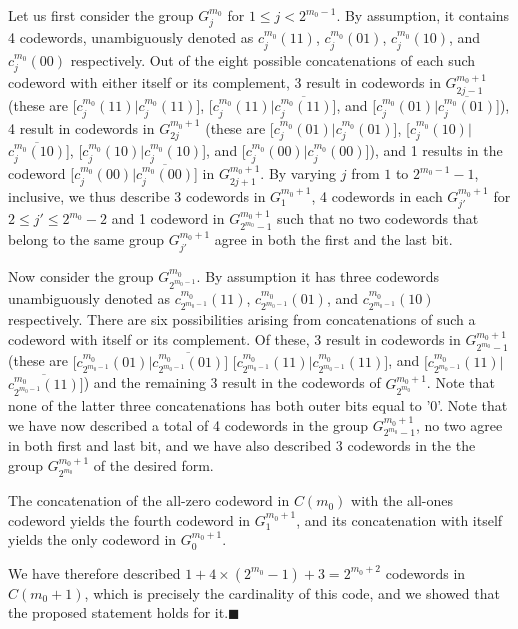 Let us first consider the group $G_j^{m_0}$ for $1 \leq j <
2^{m_0-1}$. By assumption, it contains 4 codewords, unambiguously denoted
as  $c_j^{m_0}(11)$,
$c_j^{m_0}(01)$, $c_j^{m_0}(10)$, and $c_j^{m_0}(00)$ respectively.
Out of the eight possible concatenations of each such codeword with either itself or its complement, 3 result in codewords in
$G_{2j-1}^{m_0+1}$ (these are [$c_j^{m_0}(11)|c_j^{m_0}(11)$],
[$c_j^{m_0}(11)|$$\overline{c_j^{m_0}(11)}$], and
[$c_j^{m_0}(01)|$$\overline{c_j^{m_0}(01)}$]), 4 result in codewords
in $G_{2j}^{m_0+1}$ (these are [$c_j^{m_0}(01)|c_j^{m_0}(01)$],
[$c_j^{m_0}(10)|$ $\overline{c_j^{m_0}(10)}$],
[$c_j^{m_0}(10)|c_j^{m_0}(10)$], and
[$c_j^{m_0}(00)|c_j^{m_0}(00)$]), and 1 results in the codeword
[$c_j^{m_0}(00)|$$\overline{c_j^{m_0}(00)}$] in $G_{2j+1}^{m_0+1}$.
By varying $j$ from $1$ to $2^{m_0-1}-1$, inclusive,
we thus describe 3 codewords in $G_1^{m_0+1}$, 4 codewords in each
$G_{j'}^{m_0+1}$ for $ 2 \leq j' \leq 2^{m_0}-2$ and 1 codeword in
$G_{2^{m_0}-1}^{m_0+1}$ such that no two codewords that belong to
the same group $G_{j'}^{m_0+1}$ agree in both the first and the last bit.

Now consider the group $G_{2^{m_0-1}}^{m_0}$. By assumption it has
three codewords unambiguously denoted as
$c_{2^{m_0-1}}^{m_0}(11)$, $c_{2^{m_0-1}}^{m_0}(01)$, and
$c_{2^{m_0 -1}}^{m_0}(10)$ respectively. There are six
possibilities arising from concatenations of such a codeword with
itself or its complement. Of these, 3 result in codewords in
$G_{2^{m_0}-1}^{m_0+1}$ (these are $[c_{2^{m_0 -1}}^{m_0}(01)
|$$\overline {c_{2^{m_0-1}}^{m_0}(01)}]$ $[c_{2^{m_0
-1}}^{m_0}(11) |$$c_{2^{m_0 -1}}^{m_0}(11)]$, and $[c_{2^{m_0
-1}}^{m_0}(11) |$$\overline{c_{2^{m_0 -1}}^{m_0}(11)}]$) and the
remaining 3 result in the codewords of $G_{2^{m_0}}^{m_0+1}$. Note
that none of the latter three concatenations has both outer bits
equal to '0'. Note that we have now described a total of 4
codewords in the group $G_{2^{m_0}-1}^{m_0+1}$, no two agree in
both first and last bit, and we have also described 3 codewords in
the the group $G_{2^{m_0}}^{m_0+1}$ of the desired form.

The concatenation of the all-zero codeword in $C(m_0)$ with the
all-ones codeword yields the fourth codeword in $G_1^{m_0+1}$, and
its concatenation with itself yields the only codeword in $G_0^{m_0+1}$.

We have therefore described $1+4\times(2^{m_0}-1)+3=2^{m_0+2}$
codewords in $C(m_0+1)$, which is precisely the cardinality of
this code, and we showed that the proposed statement holds for
it.\hfill $\blacksquare$

